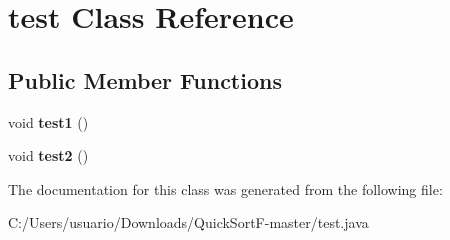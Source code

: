 \hypertarget{classtest}{}\section{test Class Reference}
\label{classtest}
\subsection*{Public Member Functions}
\begin{DoxyCompactItemize}
\item 
\mbox{\label{classtest_afa01bd382d0b2a9ff94d730274be18d1}} 
void {\bfseries test1} ()
\item 
\mbox{\label{classtest_a36f3d17094ee145807a8c6dc2fd0daf4}} 
void {\bfseries test2} ()
\end{DoxyCompactItemize}


The documentation for this class was generated from the following file\+:\begin{DoxyCompactItemize}
\item 
C\+:/\+Users/usuario/\+Downloads/\+Quick\+Sort\+F-\/master/test.\+java\end{DoxyCompactItemize}
